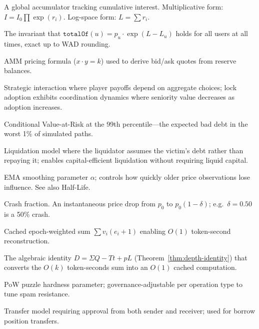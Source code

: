 \documentclass[10pt,a4paper,twocolumn]{article}
\begin{document}
\begin{description}[style=nextline, leftmargin=2.5em, labelindent=0em, font=\normalfont\bfseries]
\item[Compounding Index] A global accumulator tracking cumulative interest. Multiplicative form: $I = I_0 \prod \exp(r_i)$. Log-space form: $L = \sum r_i$.

\item[Conservation] The invariant that $\texttt{totalOf}(u) = p_u \cdot \exp(L - L_u)$ holds for all users at all times, exact up to WAD rounding.

\item[Constant Product] AMM pricing formula ($x \cdot y = k$) used to derive bid/ask quotes from reserve balances.

\item[Coordination Game] Strategic interaction where player payoffs depend on aggregate choices; lock adoption exhibits coordination dynamics where seniority value decreases as adoption increases.

\item[$\text{CVaR}(99\%)$\,$\dagger$] Conditional Value-at-Risk at the 99th percentile---the expected bad debt in the worst 1\% of simulated paths.


\item[Debt Assumption] Liquidation model where the liquidator assumes the victim's debt rather than repaying it; enables capital-efficient liquidation without requiring liquid capital.

\item[Decay Factor] EMA smoothing parameter $\alpha$; controls how quickly older price observations lose influence. See also Half-Life.

\item[$\delta$\,$\dagger$] Crash fraction. An instantaneous price drop from $p_0$ to $p_0(1{-}\delta)$; e.g.\ $\delta = 0.50$ is a 50\% crash.

\item[Depth ($\Sigma$)] Cached epoch-weighted sum $\sum v_i(e_i{+}1)$ enabling $O(1)$ token-second reconstruction.

\item[Depth Identity] The algebraic identity $D = \Sigma Q - Tt + pL$ (Theorem~\ref{thm:depth-identity}) that converts the $O(k)$ token-seconds sum into an $O(1)$ cached computation.

\item[Difficulty] PoW puzzle hardness parameter; governance-adjustable per operation type to tune spam resistance.

\item[Dual Approval] Transfer model requiring approval from both sender and receiver; used for borrow position transfers.


\end{description}
\end{document}
